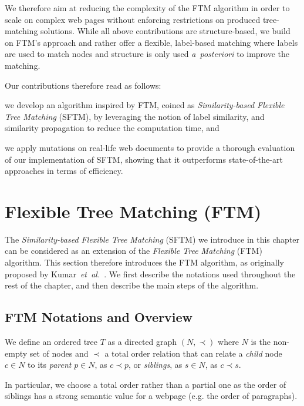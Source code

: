 We therefore aim at reducing the complexity of the FTM algorithm in order to scale on complex web pages without enforcing restrictions on produced tree-matching solutions.
While all above contributions are structure-based, we build on FTM's approach and rather offer a flexible, label-based matching where labels are used to match nodes and structure is only used \emph{a~posteriori} to improve the matching.

Our contributions therefore read as follows:
\begin{compactenum}
    \item we develop an algorithm inspired by FTM, coined as \emph{Similarity-based Flexible Tree Matching} (SFTM), by leveraging the notion of label similarity, and similarity propagation to reduce the computation time, and
    \item we apply mutations on real-life web documents to provide a thorough evaluation of our implementation of SFTM, showing that it outperforms state-of-the-art approaches in terms of efficiency.
\end{compactenum}

\section{Flexible Tree Matching (FTM)}\label{sftm:sec:ftm}
The \emph{Similarity-based Flexible Tree Matching} (SFTM) we introduce in this chapter can be considered as an extension of the \textit{Flexible Tree Matching} (FTM) algorithm.
This section therefore introduces the FTM algorithm, as originally proposed by Kumar~\emph{et~al.}~\cite{Kumar2011_Bricolage}.
We first describe the notations used throughout the rest of the chapter, and then describe the main steps of the algorithm.

\subsection{FTM Notations and Overview}
We define an ordered tree $T$ as a directed graph $(N,\prec)$ where $N$ is the non-empty set of nodes and $\prec$ a total order relation that can relate a \emph{child} node $c \in N$ to its \emph{parent} $p \in N$, as $c \prec p$, or \emph{siblings}, as $s \in N$, as $c \prec s$.

In particular, we choose a total order rather than a partial one as the order of siblings has a strong semantic value for a webpage (e.g. the order of paragraphs).

